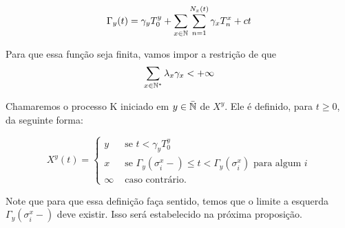 \begin{equation}
  \label{def:Gamma}
  \Gamma_y (t) = \gamma_y T_0^y
  + \sum_{x \in {\mathbb{N}}} \sum_{n = 1}^{N_x(t)}
  \gamma_x T_n^x
  + ct
\end{equation}

Para que essa função seja \qc finita, vamos impor a restrição de que
\begin{equation}
  \sum_{x \in {\mathbb{N^*}}} \lambda_x\gamma_x < +\infty
\end{equation}

Chamaremos o processo K iniciado em $y \in {\bar{{\mathbb{N}}}}$ de $X^y$. Ele é
definido, para $t \geq 0$, da seguinte forma:

\begin{equation}
  \label{def:procK}
  X^y (t) =
  \begin{cases}
    y & \textrm{ se }  t < \gamma_y T_0^y\\
    x & \textrm{ se } \Gamma_y(\sigma_i^x-) \leq t <
    \Gamma_y(\sigma^x_i)
    \textrm{ para algum } i \\
    \infty & \textrm{ caso contrário.}
  \end{cases}
\end{equation}

Note que para que essa definição faça sentido, temos que o limite a
esquerda $\Gamma_y (\sigma_i^x-)$ deve existir. Isso será estabelecido
na próxima proposição.

